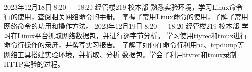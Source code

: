 \documentclass{swfulabjournal}
\begin{document}
\maketitle %

\addjournal%
{%
  2023年12月18日}%
{%
  8:20 --- 18:20}%
{%
  经管楼219}%
{%
  校本部}%
{%
  熟悉实验环境，学习Linux命令行的使用，查阅相关网络命令的手册。}%
{%
  掌握了常用Linux命令的使用，了解了常用网络命令的功用和操作方法。}%
\clearpage
\addjournal%
{%
  2023年12月19日}%
{%
  8:20 --- 18:20}%
{%
  经管楼219}%
{%
  校本部}%
{%
  学习在Linux平台抓取网络数据包，并进行逐字节分析。
  学习使用ttyrec和tmux进行命令行操作的录屏，并撰写实习报告。}%
{%
  了解了如何在命令行利用nc、tcpdump等网络工具搭建实验环境，并抓取、分析
  数据包。学会了利用ttyrec和tmux录制HTTP实验的过程。}%
\end{document}
